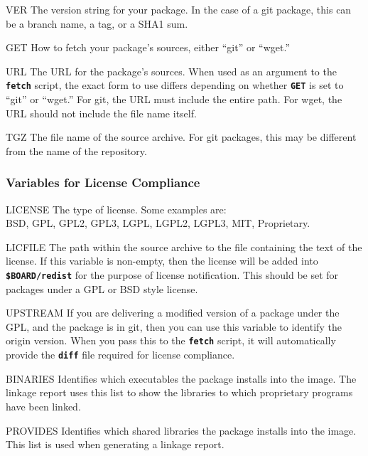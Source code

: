 \documentclass[a4paper,10pt]{article}
\newenvironment{Description}[1][\quad]{%
  \begin{list}{}{%
      \renewcommand{\makelabel}[1]{\textbf{##1}\hfill}%
      \settowidth{\labelwidth}{\textbf{#1}}%
      \setlength{\leftmargin}{\labelwidth+\labelsep}%
  }%
}{%
  \end{list}%
}
\newcommand{\fw}{\tt\bf}
\begin{document}
    \begin{Description}[XXXXXX]
    \item[VER]
      The version string for your package. In the case of a git
      package, this can be a branch name, a tag, or a SHA1 sum.

    \item[GET]
      How to fetch your package's sources, either ``git'' or ``wget.''

    \item[URL]
      The URL for the package's sources. When used as an argument to
      the {\fw fetch} script, the exact form to use differs depending
      on whether {\fw GET} is set to ``git'' or ``wget.''  For git,
      the URL must include the entire path. For wget, the URL should
      not include the file name itself.

    \item[TGZ]
      The file name of the source archive. For git packages, this may
      be different from the name of the repository.

    \end{Description}

\subsubsection{Variables for License Compliance}

    \begin{Description}[UPSTREAMXX]
    \item[LICENSE]
      The type of license. Some examples are: \\
      BSD, GPL, GPL2, GPL3, LGPL, LGPL2, LGPL3, MIT, Proprietary.

    \item[LICFILE]
      The path within the source archive to the file containing the
      text of the license. If this variable is non-empty, then the
      license will be added into {\fw \$BOARD/redist} for the purpose
      of license notification. This should be set for packages under a
      GPL or BSD style license.

    \item[UPSTREAM]
      If you are delivering a modified version of a package under the
      GPL, and the package is in git, then you can use this variable
      to identify the origin version. When you pass this to the
      {\fw fetch} script, it will automatically provide the {\fw diff}
      file required for license compliance.

    \item[BINARIES]
      Identifies which executables the package installs into the
      image. The linkage report uses this list to show the libraries
      to which proprietary programs have been linked.

    \item[PROVIDES]
      Identifies which shared libraries the package installs into the
      image. This list is used when generating a linkage report.

    \end{Description}
\end{document}
